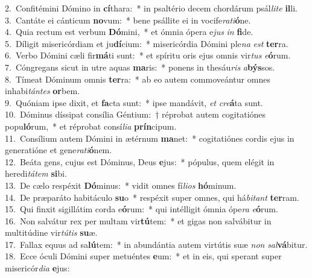 {2.~}Confitémini Dómino in \textbf{cí}thara:~* in psaltério decem chordárum psál\textit{li}\textit{te} \textbf{il}li.\\
{3.~}Cantáte ei cánticum \textbf{no}vum:~* bene psállite ei in vocife\textit{ra}\textit{ti}\textbf{ó}ne.\\
{4.~}Quia rectum est verbum \textbf{Dó}mini,~* et ómnia ópera e\textit{jus} \textit{in} \textbf{fi}de.\\
{5.~}Díligit misericórdiam et ju\textbf{dí}cium:~* misericórdia Dómini ple\textit{na} \textit{est} \textbf{ter}ra.\\
{6.~}Verbo Dómini cæli fir\textbf{má}ti sunt:~* et spíritu oris ejus omnis vir\textit{tus} \textit{e}\textbf{ó}rum.\\
{7.~}Cóngregans sicut in utre aquas \textbf{ma}ris:~* ponens in thesáu\textit{ris} \textit{a}\textbf{býs}sos.\\
{8.~}Tímeat Dóminum omnis \textbf{ter}ra:~* ab eo autem commoveántur omnes inhabi\textit{tán}\textit{tes} \textbf{or}bem.\\
{9.~}Quóniam ipse dixit, et \textbf{fa}cta sunt:~* ipse mandávit, \textit{et} \textit{cre}\textbf{á}ta sunt.\\
{10.~}Dóminus díssipat consília Géntium:~† réprobat autem cogitatiónes popu\textbf{ló}rum,~* et réprobat consí\textit{li}\textit{a} \textbf{prín}cipum.\\
{11.~}Consílium autem Dómini in ætérnum \textbf{ma}net:~* cogitatiónes cordis ejus in generatióne et gene\textit{ra}\textit{ti}\textbf{ó}nem.\\
{12.~}Beáta gens, cujus est Dóminus, Deus \textbf{e}jus:~* pópulus, quem elégit in heredi\textit{tá}\textit{tem} \textbf{si}bi.\\
{13.~}De cælo respéxit \textbf{Dó}minus:~* vidit omnes fí\textit{li}\textit{os} \textbf{hó}minum.\\
{14.~}De præparáto habitáculo \textbf{su}o~* respéxit super omnes, qui há\textit{bi}\textit{tant} \textbf{ter}ram.\\
{15.~}Qui finxit sigillátim corda e\textbf{ó}rum:~* qui intélligit ómnia ópe\textit{ra} \textit{e}\textbf{ó}rum.\\
{16.~}Non salvátur rex per multam vir\textbf{tú}tem:~* et gigas non salvábitur in multitúdine vir\textit{tú}\textit{tis} \textbf{su}æ.\\
{17.~}Fallax equus ad sa\textbf{lú}tem:~* in abundántia autem virtútis suæ \textit{non} \textit{sal}\textbf{vá}bitur.\\
{18.~}Ecce óculi Dómini super metuéntes \textbf{e}um:~* et in eis, qui sperant super misericór\textit{di}\textit{a} \textbf{e}jus:\\
